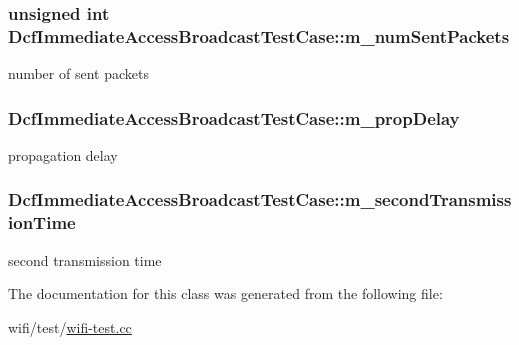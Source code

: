 \subsubsection[{\texorpdfstring{m\+\_\+num\+Sent\+Packets}{m_numSentPackets}}]{\setlength{\rightskip}{0pt plus 5cm}unsigned int Dcf\+Immediate\+Access\+Broadcast\+Test\+Case\+::m\+\_\+num\+Sent\+Packets\hspace{0.3cm}{\ttfamily [private]}}\hypertarget{classDcfImmediateAccessBroadcastTestCase_a8934bfdda7efae56e84c18a799379780}{}\label{classDcfImmediateAccessBroadcastTestCase_a8934bfdda7efae56e84c18a799379780}


number of sent packets 

\subsubsection[{\texorpdfstring{m\+\_\+prop\+Delay}{m_propDelay}}]{ Dcf\+Immediate\+Access\+Broadcast\+Test\+Case\+::m\+\_\+prop\+Delay\hspace{0.3cm}{\ttfamily [private]}}\hypertarget{classDcfImmediateAccessBroadcastTestCase_a6fceb2537384282ce7ee4cdc47d5feef}{}\label{classDcfImmediateAccessBroadcastTestCase_a6fceb2537384282ce7ee4cdc47d5feef}


propagation delay 

\subsubsection[{\texorpdfstring{m\+\_\+second\+Transmission\+Time}{m_secondTransmissionTime}}]{ Dcf\+Immediate\+Access\+Broadcast\+Test\+Case\+::m\+\_\+second\+Transmission\+Time\hspace{0.3cm}{\ttfamily [private]}}\hypertarget{classDcfImmediateAccessBroadcastTestCase_a89eee6c68fefdc0af43f7b610a3ec686}{}\label{classDcfImmediateAccessBroadcastTestCase_a89eee6c68fefdc0af43f7b610a3ec686}


second transmission time 



The documentation for this class was generated from the following file\+:\begin{DoxyCompactItemize}
\item 
wifi/test/\hyperlink{wifi-test_8cc}{wifi-\/test.\+cc}\end{DoxyCompactItemize}
